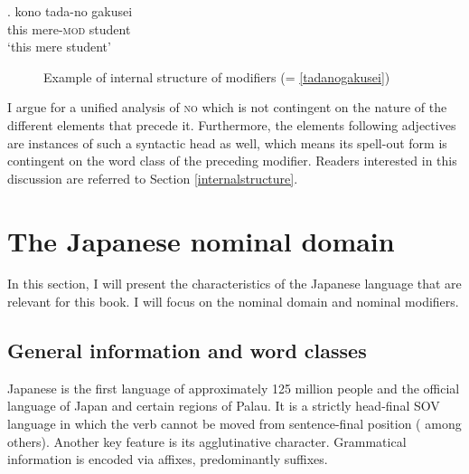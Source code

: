 \exg. kono tada-no gakusei\\
this mere-\textsc{mod} student\\
`this mere student’ \label{tadanogakusei} 

\begin{figure}
\centering
{}
\caption{Example of internal structure of modifiers (= \ref{tadanogakusei})}
\label{Example internal structure}
\end{figure}

I argue for a unified analysis of \textsc{no} which is not contingent on the nature of the different elements that precede it. Furthermore, the elements following adjectives are instances of such a syntactic head as well, which means its spell-out form is contingent on the word class of the preceding modifier. Readers interested in this discussion are referred to Section \ref{internalstructure}.

\section{The Japanese nominal domain} \label{intro japanese}

In this section, I will present the characteristics of the Japanese language that are relevant for this book. I will focus on the nominal domain and nominal modifiers.

\subsection{General information and word classes}

Japanese is the first language of approximately 125 million people and the official language of Japan and certain regions of Palau. It is a strictly head-final SOV language in which the verb cannot be moved from sentence-final position (\citealt{kuno:1973:structure, martin:1975:reference, iwasaki:2013:japanese} among others). Another key feature is its agglutinative character. Grammatical information is encoded via affixes, predominantly suffixes. 

